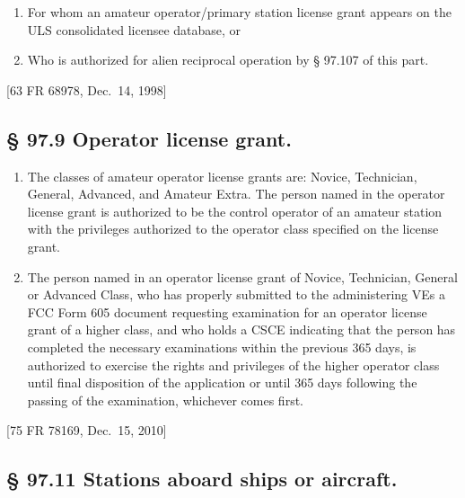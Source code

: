 \documentclass[
  letterpaper,
  DIV=11,
  numbers=noendperiod]{scrreport}
\begin{document}
\begin{enumerate}
\def\labelenumi{(\alph{enumi})}
\item
  For whom an amateur operator/primary station license grant appears on
  the ULS consolidated licensee database, or
\item
  Who is authorized for alien reciprocal operation by § 97.107 of this
  part.
\end{enumerate}

{[}63 FR 68978, Dec.~14, 1998{]}

\hypertarget{97.9}{%
\subsection*{§ 97.9 Operator license grant.}\label{97.9}}

\begin{enumerate}
\def\labelenumi{(\alph{enumi})}
\item
  The classes of amateur operator license grants are: Novice,
  Technician, General, Advanced, and Amateur Extra. The person named in
  the operator license grant is authorized to be the control operator of
  an amateur station with the privileges authorized to the operator
  class specified on the license grant.
\item
  The person named in an operator license grant of Novice, Technician,
  General or Advanced Class, who has properly submitted to the
  administering VEs a FCC Form 605 document requesting examination for
  an operator license grant of a higher class, and who holds a CSCE
  indicating that the person has completed the necessary examinations
  within the previous 365 days, is authorized to exercise the rights and
  privileges of the higher operator class until final disposition of the
  application or until 365 days following the passing of the
  examination, whichever comes first.
\end{enumerate}

{[}75 FR 78169, Dec.~15, 2010{]}

\hypertarget{97.11}{%
\subsection*{§ 97.11 Stations aboard ships or aircraft.}\label{97.11}}
\end{document}
